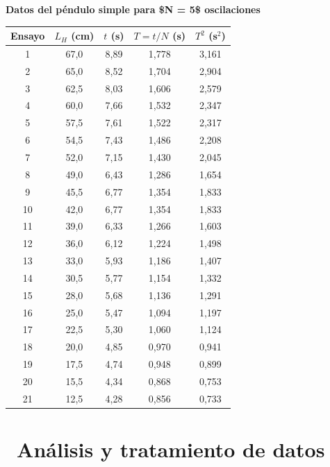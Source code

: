 \documentclass[11pt,a4paper]{article}
\newcommand{\iconotexto}[2]{\textcolor{cyanNeon}{\faIcon{#1}}~#2}
\begin{document}
\begin{center}
\begin{minipage}{\linewidth}
\centering
{\small
\textbf{Datos del péndulo simple para \$N = 5\$ oscilaciones}\par\smallskip
\begin{tabular}{@{}ccccc@{}}
\toprule
Ensayo & $L_H$ (cm) & $t$ (s) & $T = t/N$ (s) & $T^2$ (s$^2$) \\
\midrule
1 & 67,0 & 8,89 & 1,778 & 3,161 \\
2 & 65,0 & 8,52 & 1,704 & 2,904 \\
3 & 62,5 & 8,03 & 1,606 & 2,579 \\
4 & 60,0 & 7,66 & 1,532 & 2,347 \\
5 & 57,5 & 7,61 & 1,522 & 2,317 \\
6 & 54,5 & 7,43 & 1,486 & 2,208 \\
7 & 52,0 & 7,15 & 1,430 & 2,045 \\
8 & 49,0 & 6,43 & 1,286 & 1,654 \\
9 & 45,5 & 6,77 & 1,354 & 1,833 \\
10 & 42,0 & 6,77 & 1,354 & 1,833 \\
11 & 39,0 & 6,33 & 1,266 & 1,603 \\
12 & 36,0 & 6,12 & 1,224 & 1,498 \\
13 & 33,0 & 5,93 & 1,186 & 1,407 \\
14 & 30,5 & 5,77 & 1,154 & 1,332 \\
15 & 28,0 & 5,68 & 1,136 & 1,291 \\
16 & 25,0 & 5,47 & 1,094 & 1,197 \\
17 & 22,5 & 5,30 & 1,060 & 1,124 \\
18 & 20,0 & 4,85 & 0,970 & 0,941 \\
19 & 17,5 & 4,74 & 0,948 & 0,899 \\
20 & 15,5 & 4,34 & 0,868 & 0,753 \\
21 & 12,5 & 4,28 & 0,856 & 0,733 \\
\bottomrule
\end{tabular}
}\par{}
\end{minipage}
\end{center}

\section{\iconotexto{calculator}{Análisis y tratamiento de datos}}
\end{document}
